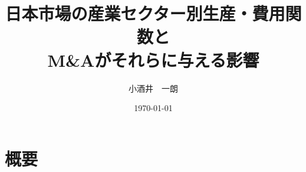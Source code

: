 \documentclass{jsarticle}
\title{日本市場の産業セクター別生産・費用関数と\\ M\&Aがそれらに与える影響}
\author{小酒井　一朗}
\date{\today}
\begin{document}
\maketitle
\section{概要}
\end{document}
